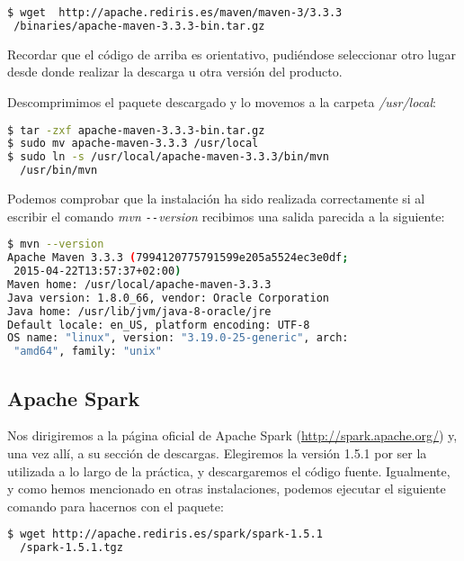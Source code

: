 \begin{lstlisting}[language=bash]
$ wget  http://apache.rediris.es/maven/maven-3/3.3.3
 /binaries/apache-maven-3.3.3-bin.tar.gz
\end{lstlisting}

Recordar que el código de arriba es orientativo, pudiéndose seleccionar otro lugar desde donde realizar la descarga u otra versión del producto.

Descomprimimos el paquete descargado y lo movemos  a la carpeta \textit{/usr/local}:

\begin{lstlisting}[language=bash,keywordstyle=\color{black}]
$ tar -zxf apache-maven-3.3.3-bin.tar.gz
$ sudo mv apache-maven-3.3.3 /usr/local
$ sudo ln -s /usr/local/apache-maven-3.3.3/bin/mvn 
  /usr/bin/mvn
\end{lstlisting}


Podemos comprobar que la instalación ha sido realizada correctamente si al escribir el comando \textit{mvn \texttt{-{}-}version} recibimos una salida parecida a la siguiente:

\begin{lstlisting}[language=bash,keywordstyle=\color{black}]
$ mvn --version
Apache Maven 3.3.3 (7994120775791599e205a5524ec3e0df;
 2015-04-22T13:57:37+02:00)
Maven home: /usr/local/apache-maven-3.3.3
Java version: 1.8.0_66, vendor: Oracle Corporation
Java home: /usr/lib/jvm/java-8-oracle/jre
Default locale: en_US, platform encoding: UTF-8
OS name: "linux", version: "3.19.0-25-generic", arch:
 "amd64", family: "unix"
\end{lstlisting}


\subsection{Apache Spark}\label{subsec:sparkInstalacion}

Nos dirigiremos a la página oficial de Apache Spark (\url{http://spark.apache.org/}) y, una vez allí, a su sección de descargas. Elegiremos la versión 1.5.1 por ser la utilizada a lo largo de la práctica, y descargaremos el código fuente. Igualmente, y como hemos mencionado en otras instalaciones, podemos ejecutar el siguiente comando para hacernos con el paquete:

\begin{lstlisting}[language=bash]
$ wget http://apache.rediris.es/spark/spark-1.5.1
  /spark-1.5.1.tgz
\end{lstlisting}


